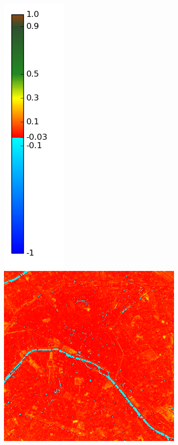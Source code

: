 \documentclass{book}
\begin{document}
\begin{figure}[H]
{\includegraphics[scale=0.2]{images/colormap.png}
\includegraphics[scale=0.25]{images/Paris/12_ndvi.png}
}
\end{figure}
\end{document}

